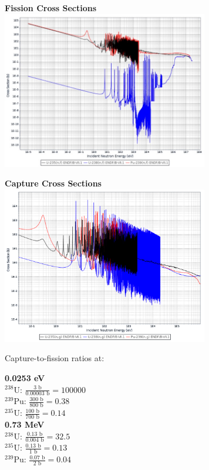 \documentclass{article}
\newcommand{\tab}{\-\hspace{1cm}}
\begin{document}
\begin{multicols}{2}
\tab\textbf{Fission Cross Sections}\\
\includegraphics[width=9cm]{fission_xs}

\tab\textbf{Capture Cross Sections}\\
\includegraphics[width=9cm]{capture_xs}
\end{multicols}

Capture-to-fission ratios at:
\begin{multicols}{2}
\begin{onehalfspace}
\textbf{0.0253 eV}\\
$^{238}\text{U}$: \tab $\frac{3\text{ b}}{0.00003\text{ b}} = 100000$\\
$^{239}\text{Pu}$: \tab $\frac{300\text{ b}}{800\text{ b}} = 0.38$\\
$^{235}\text{U}$: \tab $\frac{100\text{ b}}{700\text{ b}} = 0.14$\\
\textbf{0.73 MeV}\\
$^{238}\text{U}$: \tab $\frac{0.13\text{ b}}{0.004\text{ b}} = 32.5$\\
$^{235}\text{U}$: \tab $\frac{0.13\text{ b}}{1\text{ b}} = 0.13$\\
$^{239}\text{Pu}$: \tab $\frac{0.07\text{ b}}{2\text{ b}} = 0.04$
\end{onehalfspace}
\end{multicols}
\end{document}

